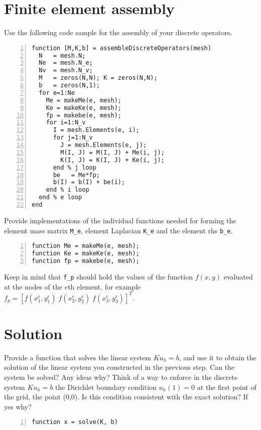\documentclass[unicode,11pt,a4paper,oneside,numbers=endperiod,openany]{scrartcl}
\begin{document}
\section{Finite element assembly}
Use the following code sample for the assembly of your discrete operators.
\begin{lstlisting}[numbers=left, numberstyle=\tiny, stepnumber=1, numbersep=10pt]
function [M,K,b] = assembleDiscreteOperators(mesh)
  N   = mesh.N;
  Ne  = mesh.N_e;
  Nv  = mesh.N_v;
  M   = zeros(N,N); K = zeros(N,N);
  b   = zeros(N,1);
  for e=1:Ne
    Me = makeMe(e, mesh);
    Ke = makeKe(e, mesh);
    fp = makebe(e, mesh);
    for i=1:N_v
      I = mesh.Elements(e, i);
      for j=1:N_v
        J = mesh.Elements(e, j);
        M(I, J) = M(I, J) + Me(i, j);
        K(I, J) = K(I, J) + Ke(i, j);
      end % j loop
      be   = Me*fp;
      b(I) = b(I) + be(i);
    end % i loop
  end % e loop
end
\end{lstlisting}
Provide implementations of the individual 
functions needed for forming the element mass matrix \lstinline+M_e+, element Laplacian \lstinline+K_e+ 
and the element rhs \lstinline+b_e+. 
\begin{lstlisting}[numbers=left, numberstyle=\tiny, stepnumber=1, numbersep=10pt, identifierstyle=\ttfamily\color{Red}\bfseries] 
function Me = makeMe(e, mesh);
function Ke = makeKe(e, mesh);
function fp = makebe(e, mesh);
\end{lstlisting}
Keep in mind that \lstinline+f_p+ should hold the values of the function $f(x,y)$
evaluated at the nodes of the $e$th element,  for example
$f_p = \left [ f(x^e_1, y^e_1) \; f(x^e_2, y^e_2) \; f(x^e_3, y^e_3)  \right ]^T$.


\section{Solution}
Provide a function that solves the linear system $K u_h = b$, and use it to obtain the solution of the linear system
you constructed in the previous step. Can the system be solved? Any ideas why? Think of a way to enforce in the discrete 
system $K u_h = b$ the Dirichlet boundary condition $u_h(1) = 0$ at the first point of the grid, the point (0,0). 
Is this condition consistent with the exact solution?
If yes why? 
\begin{lstlisting}[numbers=left, numberstyle=\tiny, stepnumber=1, numbersep=10pt, identifierstyle=\ttfamily\color{Red}\bfseries] 
function x = solve(K, b)
\end{lstlisting}
\end{document}

